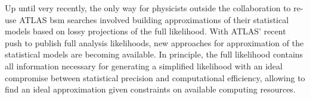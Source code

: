 Up until very recently, the only way for physicists outside the collaboration to re-use ATLAS \gls{bsm} searches involved building approximations of their statistical models based on lossy projections of the full likelihood. With ATLAS' recent push to publish full analysis likelihoods, new approaches for approximation of the statistical models are becoming available. In principle, the full likelihood contains all information necessary for generating a simplified likelihood with an ideal compromise between statistical precision and computational efficiency, allowing to find an ideal approximation given constraints on available computing resources. 





